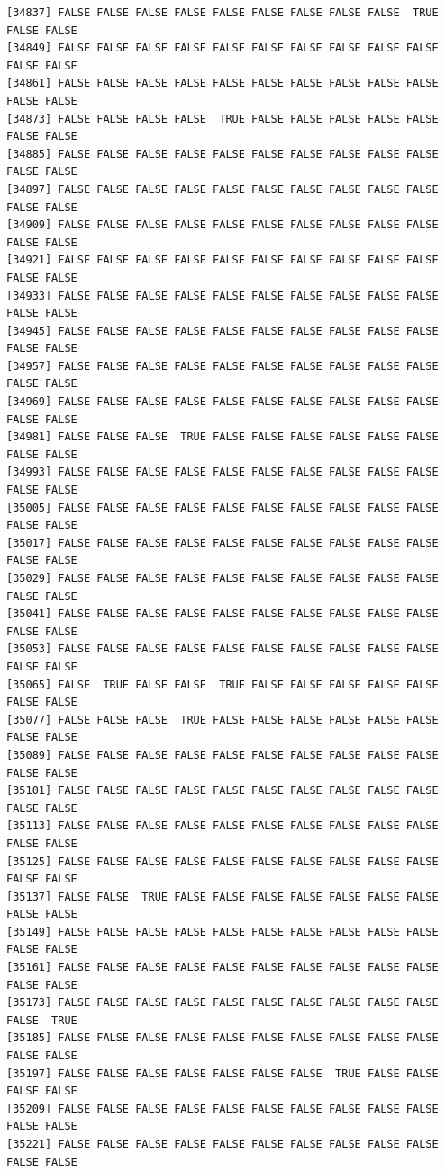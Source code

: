 \documentclass[
  a4paper,
  DIV=11,
  numbers=noendperiod]{scrartcl}
\begin{document}
\begin{verbatim}
[34837] FALSE FALSE FALSE FALSE FALSE FALSE FALSE FALSE FALSE  TRUE FALSE FALSE
[34849] FALSE FALSE FALSE FALSE FALSE FALSE FALSE FALSE FALSE FALSE FALSE FALSE
[34861] FALSE FALSE FALSE FALSE FALSE FALSE FALSE FALSE FALSE FALSE FALSE FALSE
[34873] FALSE FALSE FALSE FALSE  TRUE FALSE FALSE FALSE FALSE FALSE FALSE FALSE
[34885] FALSE FALSE FALSE FALSE FALSE FALSE FALSE FALSE FALSE FALSE FALSE FALSE
[34897] FALSE FALSE FALSE FALSE FALSE FALSE FALSE FALSE FALSE FALSE FALSE FALSE
[34909] FALSE FALSE FALSE FALSE FALSE FALSE FALSE FALSE FALSE FALSE FALSE FALSE
[34921] FALSE FALSE FALSE FALSE FALSE FALSE FALSE FALSE FALSE FALSE FALSE FALSE
[34933] FALSE FALSE FALSE FALSE FALSE FALSE FALSE FALSE FALSE FALSE FALSE FALSE
[34945] FALSE FALSE FALSE FALSE FALSE FALSE FALSE FALSE FALSE FALSE FALSE FALSE
[34957] FALSE FALSE FALSE FALSE FALSE FALSE FALSE FALSE FALSE FALSE FALSE FALSE
[34969] FALSE FALSE FALSE FALSE FALSE FALSE FALSE FALSE FALSE FALSE FALSE FALSE
[34981] FALSE FALSE FALSE  TRUE FALSE FALSE FALSE FALSE FALSE FALSE FALSE FALSE
[34993] FALSE FALSE FALSE FALSE FALSE FALSE FALSE FALSE FALSE FALSE FALSE FALSE
[35005] FALSE FALSE FALSE FALSE FALSE FALSE FALSE FALSE FALSE FALSE FALSE FALSE
[35017] FALSE FALSE FALSE FALSE FALSE FALSE FALSE FALSE FALSE FALSE FALSE FALSE
[35029] FALSE FALSE FALSE FALSE FALSE FALSE FALSE FALSE FALSE FALSE FALSE FALSE
[35041] FALSE FALSE FALSE FALSE FALSE FALSE FALSE FALSE FALSE FALSE FALSE FALSE
[35053] FALSE FALSE FALSE FALSE FALSE FALSE FALSE FALSE FALSE FALSE FALSE FALSE
[35065] FALSE  TRUE FALSE FALSE  TRUE FALSE FALSE FALSE FALSE FALSE FALSE FALSE
[35077] FALSE FALSE FALSE  TRUE FALSE FALSE FALSE FALSE FALSE FALSE FALSE FALSE
[35089] FALSE FALSE FALSE FALSE FALSE FALSE FALSE FALSE FALSE FALSE FALSE FALSE
[35101] FALSE FALSE FALSE FALSE FALSE FALSE FALSE FALSE FALSE FALSE FALSE FALSE
[35113] FALSE FALSE FALSE FALSE FALSE FALSE FALSE FALSE FALSE FALSE FALSE FALSE
[35125] FALSE FALSE FALSE FALSE FALSE FALSE FALSE FALSE FALSE FALSE FALSE FALSE
[35137] FALSE FALSE  TRUE FALSE FALSE FALSE FALSE FALSE FALSE FALSE FALSE FALSE
[35149] FALSE FALSE FALSE FALSE FALSE FALSE FALSE FALSE FALSE FALSE FALSE FALSE
[35161] FALSE FALSE FALSE FALSE FALSE FALSE FALSE FALSE FALSE FALSE FALSE FALSE
[35173] FALSE FALSE FALSE FALSE FALSE FALSE FALSE FALSE FALSE FALSE FALSE  TRUE
[35185] FALSE FALSE FALSE FALSE FALSE FALSE FALSE FALSE FALSE FALSE FALSE FALSE
[35197] FALSE FALSE FALSE FALSE FALSE FALSE FALSE  TRUE FALSE FALSE FALSE FALSE
[35209] FALSE FALSE FALSE FALSE FALSE FALSE FALSE FALSE FALSE FALSE FALSE FALSE
[35221] FALSE FALSE FALSE FALSE FALSE FALSE FALSE FALSE FALSE FALSE FALSE FALSE

\end{verbatim}
\end{document}
